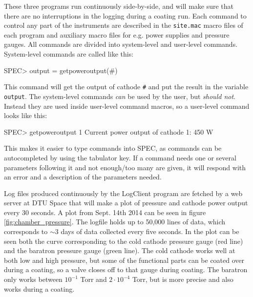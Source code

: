 These three programs run continuously side-by-side, and will make sure that there are no interruptions in the logging during a coating run. Each command to control any part of the instruments are described in the \verb'site.mac' macro files of each program and auxiliary macro files for e.g. power supplies and pressure gauges. All commands are divided into system-level and user-level commands. System-level commands are called like this:

\begin{verbcode}
  SPEC> output = getpoweroutput(#)
\end{verbcode}

This command will get the output of cathode \verb'#' and put the result in the variable \verb'output'. The system-level commands \emph{can} be used by the user, but \emph{should not}. Instead they are used inside user-level command macros, so a user-level command looks like this:

\begin{verbcode}
  SPEC> getpoweroutput 1
  Current power output of cathode 1: 450 W
\end{verbcode}

This makes it easier to type commands into SPEC, as commands can be autocompleted by using the tabulator key. If a command needs one or several parameters following it and not enough/too many are given, it will respond with an error and a description of the parameters needed.

Log files produced continuously by the LogClient program are fetched by a web server at DTU Space that will make a plot of pressure and cathode power output every 30 seconds. A plot from Sept. 14th 2014 can be seen in figure \ref{fig:chamber_pressure}. The logfile holds up to 50,000 lines of data, which corresponds to $\sim$3 days of data collected every five seconds. In the plot can be seen both the curve corresponding to the cold cathode pressure gauge (red line) and the baratron pressure gauge (green line). The cold cathode works well at both low and high pressure, but some of the functional parts can be coated over during a coating, so a valve closes off to that gauge during coating. The baratron only works between $10^{-1}$ Torr and $2\cdot10^{-4}$ Torr, but is more precise and also works during a coating.

